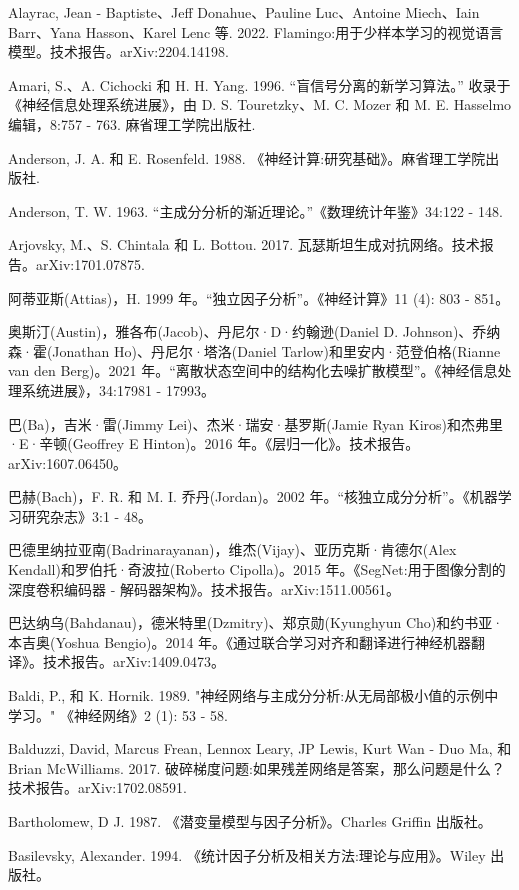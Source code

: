 \documentclass[10pt]{article}
\begin{document}
Alayrac, Jean - Baptiste、Jeff Donahue、Pauline Luc、Antoine Miech、Iain Barr、Yana Hasson、Karel Lenc 等. 2022. Flamingo:用于少样本学习的视觉语言模型。技术报告。arXiv:2204.14198.

Amari, S.、A. Cichocki 和 H. H. Yang. 1996. “盲信号分离的新学习算法。” 收录于《神经信息处理系统进展》，由 D. S. Touretzky、M. C. Mozer 和 M. E. Hasselmo 编辑，8:757 - 763. 麻省理工学院出版社.

Anderson, J. A. 和 E. Rosenfeld. 1988. 《神经计算:研究基础》。麻省理工学院出版社.

Anderson, T. W. 1963. “主成分分析的渐近理论。”《数理统计年鉴》34:122 - 148.

Arjovsky, M.、S. Chintala 和 L. Bottou. 2017. 瓦瑟斯坦生成对抗网络。技术报告。arXiv:1701.07875.

阿蒂亚斯(Attias)，H. 1999 年。“独立因子分析”。《神经计算》11 (4): 803 - 851。

奥斯汀(Austin)，雅各布(Jacob)、丹尼尔·D·约翰逊(Daniel D. Johnson)、乔纳森·霍(Jonathan Ho)、丹尼尔·塔洛(Daniel Tarlow)和里安内·范登伯格(Rianne van den Berg)。2021 年。“离散状态空间中的结构化去噪扩散模型”。《神经信息处理系统进展》，34:17981 - 17993。

巴(Ba)，吉米·雷(Jimmy Lei)、杰米·瑞安·基罗斯(Jamie Ryan Kiros)和杰弗里·E·辛顿(Geoffrey E Hinton)。2016 年。《层归一化》。技术报告。arXiv:1607.06450。

巴赫(Bach)，F. R. 和 M. I. 乔丹(Jordan)。2002 年。“核独立成分分析”。《机器学习研究杂志》3:1 - 48。

巴德里纳拉亚南(Badrinarayanan)，维杰(Vijay)、亚历克斯·肯德尔(Alex Kendall)和罗伯托·奇波拉(Roberto Cipolla)。2015 年。《SegNet:用于图像分割的深度卷积编码器 - 解码器架构》。技术报告。arXiv:1511.00561。

巴达纳乌(Bahdanau)，德米特里(Dzmitry)、郑京勋(Kyunghyun Cho)和约书亚·本吉奥(Yoshua Bengio)。2014 年。《通过联合学习对齐和翻译进行神经机器翻译》。技术报告。arXiv:1409.0473。

Baldi, P., 和 K. Hornik. 1989. "神经网络与主成分分析:从无局部极小值的示例中学习。" 《神经网络》2 (1): 53 - 58.

Balduzzi, David, Marcus Frean, Lennox Leary, JP Lewis, Kurt Wan - Duo Ma, 和 Brian McWilliams. 2017. 破碎梯度问题:如果残差网络是答案，那么问题是什么？技术报告。arXiv:1702.08591.

Bartholomew, D J. 1987. 《潜变量模型与因子分析》。Charles Griffin 出版社。

Basilevsky, Alexander. 1994. 《统计因子分析及相关方法:理论与应用》。Wiley 出版社。
\end{document}
